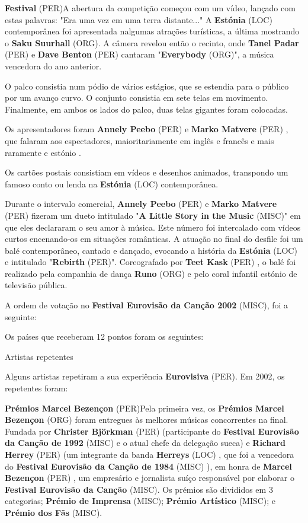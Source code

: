 \documentclass[12pt,a4paper]{article}
\begin{document}
\textbf{Festival} (PER)A abertura da competição começou com um vídeo, lançado com estas palavras: "Era uma vez em uma terra distante..." A \textbf{Estónia} (LOC) contemporânea foi apresentada nalgumas atrações turísticas, a última mostrando o \textbf{Saku Suurhall} (ORG). A câmera revelou então o recinto, onde \textbf{Tanel Padar} (PER) e \textbf{Dave Benton} (PER) cantaram "\textbf{Everybody} (ORG)", a música vencedora do ano anterior.

O palco consistia num pódio de vários estágios, que se estendia para o público por um avanço curvo. O conjunto consistia em sete telas em movimento. Finalmente, em ambos os lados do palco, duas telas gigantes foram colocadas.

Os apresentadores foram \textbf{Annely Peebo} (PER) e \textbf{Marko Matvere} (PER) , que falaram aos espectadores, maioritariamente em inglês e francês e mais raramente e estónio .

Os cartões postais consistiam em vídeos e desenhos animados, transpondo um famoso conto ou lenda na \textbf{Estónia} (LOC) contemporânea.

Durante o intervalo comercial, \textbf{Annely Peebo} (PER) e \textbf{Marko Matvere} (PER) fizeram um dueto intitulado "\textbf{A Little Story in the Music} (MISC)" em que eles declararam o seu amor à música. Este número foi intercalado com vídeos curtos encenando-os em situações românticas. A atuação no final do desfile foi um balé contemporâneo, cantado e dançado, evocando a história da \textbf{Estónia} (LOC) e intitulado "\textbf{Rebirth} (PER)". Coreografado por \textbf{Teet Kask} (PER) , o balé foi realizado pela companhia de dança \textbf{Runo} (ORG) e pelo coral infantil estónio de televisão pública.

A ordem de votação no \textbf{Festival Eurovisão da Canção 2002} (MISC), foi a seguinte:

Os países que receberam 12 pontos foram os seguintes:



Artistas repetentes

Alguns artistas repetiram a sua experiência \textbf{Eurovisiva} (PER). Em 2002, os repetentes foram:



\textbf{Prémios Marcel Bezençon} (PER)Pela primeira vez, os \textbf{Prémios Marcel Bezençon} (ORG) foram entregues às melhores músicas concorrentes na final. Fundada por \textbf{Christer Björkman} (PER) (participante do \textbf{Festival Eurovisão da Canção de 1992} (MISC) e o atual chefe da delegação sueca) e \textbf{Richard Herrey} (PER) (um integrante da banda \textbf{Herreys} (LOC) , que foi a vencedora do \textbf{Festival Eurovisão da Canção de 1984} (MISC) ), em honra de \textbf{Marcel Bezençon} (PER) , um empresário e jornalista suíço responsável por elaborar o \textbf{Festival Eurovisão da Canção} (MISC). Os prémios são divididos em 3 categorias; \textbf{Prémio de Imprensa} (MISC); \textbf{Prémio Artístico} (MISC); e \textbf{Prémio dos Fãs} (MISC).
\end{document}
